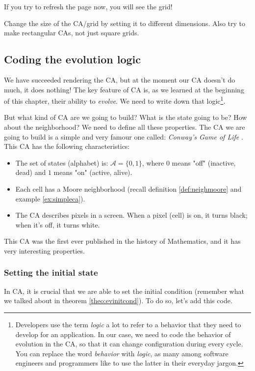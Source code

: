 If you try to refresh the page now, you will see the grid!

\begin{problem}
\label{prob:changecasize}
Change the size of the CA/grid by setting it to different dimensions. Also try to make rectangular CAs, not
just square grids.
\end{problem}

\subsection{Coding the evolution logic}
We have succeeded rendering the CA, but at the moment our CA doesn't do much, it does nothing!
The key feature of CA is, as we learned at the beginning of this chapter, their ability to
\textit{evolve}. We need to write down that
logic\footnote{Developers use the term \textit{logic} a lot to refer to a behavior that they need
to develop for an application. In our case, we need to code the behavior of evolution in the CA,
so that it can change configuration during every cycle. You can replace the word
\textit{behavior} with \textit{logic}, as many among software engineers and programmers like to
use the latter in their everyday jargon.}.

But what kind of CA are we going to build? What is the state going to be? How about the neighborhood? We
need to define all these properties. The CA we are going to build is a simple and very famour one called:
\textit{Conway's Game of Life} \cite{wolfram-ca}. This CA has the following characteristics:

\begin{itemize}
\item The set of states (alphabet) is: $\mathcal{A} = \{ 0, 1 \}$, where $0$ means "off" (inactive, dead) and
$1$ means "on" (active, alive).
\item Each cell has a Moore neighborhood (recall definition \ref{def:neighmoore} and example \ref{ex:simpleca}).
\item The CA describes pixels in a screen. When a pixel (cell) is on, it turns black; when it's off, it
turns white. 
\end{itemize}

This CA was the first ever published in the history of Mathematics, and it has very interesting properties.

\subsubsection{Setting the initial state}
In CA, it is crucial that we are able to set the initial condition (remember what we talked about in
theorem \ref{theo:evinitcond}). To do so, let's add this code.

